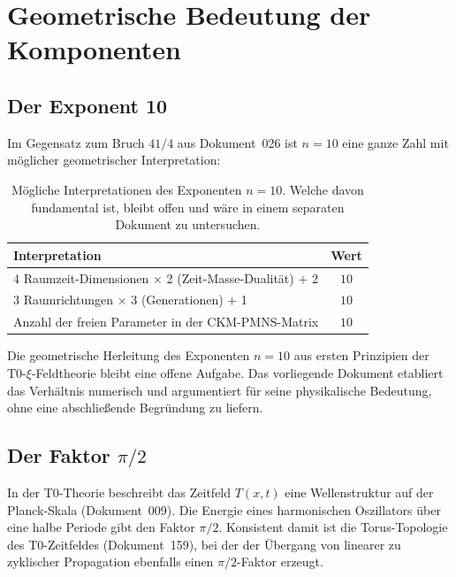 \section{Geometrische Bedeutung der Komponenten}
\label{sec:geometrie}

\subsection{Der Exponent 10}

Im Gegensatz zum Bruch $41/4$ aus Dokument~026 ist $n = 10$ eine ganze Zahl
mit möglicher geometrischer Interpretation:

\begin{table}[H]
    \centering
    \begin{tabular}{lc}
        \toprule
        \textbf{Interpretation} & \textbf{Wert} \\
        \midrule
        4 Raumzeit-Dimensionen $\times$ 2 (Zeit-Masse-Dualität) $+$ 2 & $10$ \\
        3 Raumrichtungen $\times$ 3 (Generationen) $+$ 1 & $10$ \\
        Anzahl der freien Parameter in der CKM-PMNS-Matrix & $10$ \\
        \bottomrule
    \end{tabular}
    \caption{Mögliche Interpretationen des Exponenten $n=10$.
    Welche davon fundamental ist, bleibt offen und
    wäre in einem separaten Dokument zu untersuchen.}
    \label{tab:exp10}
\end{table}

\begin{important}
    Die geometrische Herleitung des Exponenten $n = 10$ aus
    ersten Prinzipien der T0-$\xi$-Feldtheorie bleibt eine offene Aufgabe.
    Das vorliegende Dokument etabliert das Verhältnis numerisch und
    argumentiert für seine physikalische Bedeutung, ohne eine
    abschließende Begründung zu liefern.
\end{important}

\subsection{Der Faktor \texorpdfstring{$\pi/2$}{pi/2}}

In der T0-Theorie beschreibt das Zeitfeld $T(x,t)$ eine Wellenstruktur
auf der Planck-Skala (Dokument~009). Die Energie eines harmonischen
Oszillators über eine halbe Periode gibt den Faktor $\pi/2$. Konsistent
damit ist die Torus-Topologie des T0-Zeitfeldes (Dokument~159), bei der
der Übergang von linearer zu zyklischer Propagation ebenfalls einen
$\pi/2$-Faktor erzeugt.

